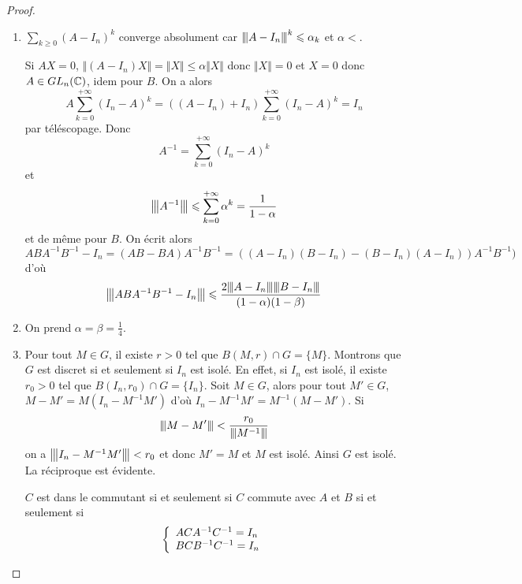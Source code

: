 \begin{proof}
	\phantom{}
	\begin{enumerate}
		\item $\sum_{k\geqslant0}(A-I_{n})^{k}$ converge absolument car ${\left\vert\kern-0.25ex\left\vert\kern-0.25ex\left\vert{}A-I_{n} \right\vert\kern-0.25ex\right\vert\kern-0.25ex\right\vert}^{k}\leqslant\alpha_{k}$ et $\alpha<$.
		
		Si $AX=0$, $\Vert (A-I_{n})X\Vert=\Vert X\Vert\leqslant\alpha\Vert X\Vert$ donc $\Vert X\Vert=0$ et $X=0$ donc $A\in GL_{n}(\mathbb{C})$, idem pour $B$. On a alors
		\begin{equation*}
			A\sum_{k=0}^{+\infty}(I_{n}-A)^{k}=((A-I_{n})+I_{n})\sum_{k=0}^{+\infty}(I_{n}-A)^{k}=I_{n}
		\end{equation*}
		par téléscopage. Donc 
		\begin{equation}A^{-1}=\sum_{k=0}^{+\infty}(I_{n}-A)^{k}\end{equation}
		et
		\begin{equation}{\left\vert\kern-0.25ex\left\vert\kern-0.25ex\left\vert{}A^{-1} \right\vert\kern-0.25ex\right\vert\kern-0.25ex\right\vert}\leqslant\sum_{k=0}^{+\infty}\alpha^{k}=\frac{1}{1-\alpha}\end{equation}
		et de même pour $B$. On écrit alors
		\begin{equation}ABA^{-1}B^{-1}-I_{n}=(AB-BA)A^{-1}B^{-1}=((A-I_{n})(B-I_{n})-(B-I_{n})(A-I_{n}))A^{-1}B^{-1})\end{equation}
		d'où
		\begin{equation}{\left\vert\kern-0.25ex\left\vert\kern-0.25ex\left\vert{}ABA^{-1}B^{-1}-I_{n} \right\vert\kern-0.25ex\right\vert\kern-0.25ex\right\vert}\leqslant\frac{2{\left\vert\kern-0.25ex\left\vert\kern-0.25ex\left\vert{}A-I_{n} \right\vert\kern-0.25ex\right\vert\kern-0.25ex\right\vert}{\left\vert\kern-0.25ex\left\vert\kern-0.25ex\left\vert{}B-I_{n} \right\vert\kern-0.25ex\right\vert\kern-0.25ex\right\vert}}{(1-\alpha)(1-\beta)}\end{equation}

		\item On prend $\alpha=\beta=\frac{1}{4}$.
		\item Pour tout $M\in G$, il existe $r>0$ tel que $B(M,r)\cap G=\{M\}$. Montrons que $G$ est discret si et seulement si $I_{n}$ est isolé. En effet, si $I_{n}$ est isolé, il existe $r_{0}>0$ tel que $B(I_{n},r_{0})\cap G=\{I_{n}\}$. Soit $M\in G$, alors pour tout $M'\in G$, $M-M'=M(I_{n}-M^{-1}M')$ d'où $I_{n}-M^{-1}M'=M^{-1}(M-M')$. Si 
		\begin{equation}{\left\vert\kern-0.25ex\left\vert\kern-0.25ex\left\vert{}M-M' \right\vert\kern-0.25ex\right\vert\kern-0.25ex\right\vert}<\frac{r_{0}}{{\left\vert\kern-0.25ex\left\vert\kern-0.25ex\left\vert{}M^{-1} \right\vert\kern-0.25ex\right\vert\kern-0.25ex\right\vert}}\end{equation}
		on a ${\left\vert\kern-0.25ex\left\vert\kern-0.25ex\left\vert{}I_{n}-M^{-1}M' \right\vert\kern-0.25ex\right\vert\kern-0.25ex\right\vert}<r_{0}$ et donc $M'=M$ et $M$ est isolé. Ainsi $G$ est isolé. La réciproque est évidente.

		$C$ est dans le commutant si et seulement si $C$ commute avec $A$ et $B$ si et seulement si
		\begin{equation}
		\left\{
			\begin{array}[]{l}
				ACA^{-1}C^{-1}=I_{n}\\
				BCB^{-1}C^{-1}=I_{n}
			\end{array}
		\right.
		\end{equation}


\end{enumerate}
\end{proof}
